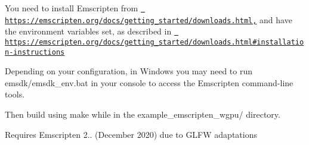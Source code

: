 
\begin{DoxyItemize}
\item You need to install Emscripten from \href{https://emscripten.org/docs/getting_started/downloads.html,}{\texttt{ https\+://emscripten.\+org/docs/getting\+\_\+started/downloads.\+html,}} and have the environment variables set, as described in \href{https://emscripten.org/docs/getting_started/downloads.html\#installation-instructions}{\texttt{ https\+://emscripten.\+org/docs/getting\+\_\+started/downloads.\+html\#installation-\/instructions}}
\item Depending on your configuration, in Windows you may need to run {\ttfamily emsdk/emsdk\+\_\+env.\+bat} in your console to access the Emscripten command-\/line tools.
\item Then build using {\ttfamily make} while in the {\ttfamily example\+\_\+emscripten\+\_\+wgpu/} directory.
\item Requires Emscripten 2.. (December 2020) due to G\+L\+FW adaptations 
\end{DoxyItemize}